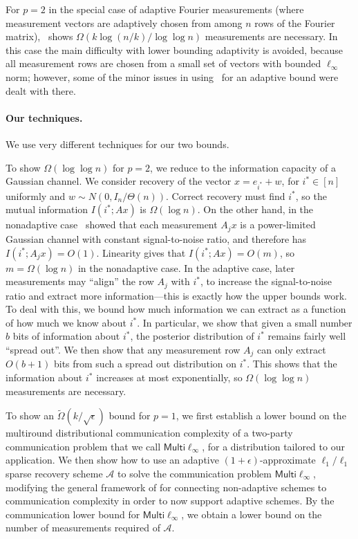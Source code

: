 \documentclass[twoside,leqno,twocolumn]{article}
\newcommand{\multiLinf}{\mathsf{Multi}\ell_{\infty}}
\def\eps{\epsilon}
\begin{document}
For $p=2$ in the special case of adaptive Fourier measurements (where
measurement vectors are adaptively chosen from among $n$ rows of the
Fourier matrix),~\cite{HIKP12} shows $\Omega(k \log (n/k) / \log \log
n)$ measurements are necessary.  In this case the main difficulty with
lower bounding adaptivity is avoided, because all measurement rows are
chosen from a small set of vectors with bounded $\ell_\infty$ norm;
however, some of the minor issues in using~\cite{PW11} for an adaptive
bound were dealt with there.

\paragraph{Our techniques.}  We use very different techniques for our
two bounds.

To show $\Omega(\log \log n)$ for $p=2$, we reduce to the information
capacity of a Gaussian channel.  We consider recovery of the vector $x
= e_{i^*} + w$, for $i^* \in [n]$ uniformly and $w \sim N(0,
I_n/\Theta(n))$.  Correct recovery must find $i^*$, so the mutual
information $I(i^*; Ax)$ is $\Omega(\log n)$.  On the other hand, in
the nonadaptive case~\cite{PW11} showed that each measurement $A_jx$
is a power-limited Gaussian channel with constant signal-to-noise
ratio, and therefore has $I(i^*; A_jx) = O(1)$.  Linearity gives that
$I(i^*; Ax) = O(m)$, so $m = \Omega(\log n)$ in the nonadaptive case.
In the adaptive case, later measurements may ``align'' the row $A_j$
with $i^*$, to increase the signal-to-noise ratio and extract more
information---this is exactly how the upper bounds work.  To deal with
this, we bound how much information we can extract as a function of
how much we know about $i^*$.  In particular, we show that given a
small number $b$ bits of information about $i^*$, the posterior
distribution of $i^*$ remains fairly well ``spread out''.  We then
show that any measurement row $A_j$ can only extract $O(b+1)$ bits
from such a spread out distribution on $i^*$.  This shows that the
information about $i^*$ increases at most exponentially, so
$\Omega(\log \log n)$ measurements are necessary.

To show an $\widetilde{\Omega}(k/\sqrt{\eps})$ bound for $p=1$, 
we first establish a lower bound on the multiround distributional 
communication complexity
of a two-party communication problem that we call $\multiLinf$, for a 
distribution tailored to our application. 
We then show how to use an adaptive $(1+\eps)$-approximate 
$\ell_1/\ell_1$ sparse
recovery scheme $\mathcal{A}$ 
to solve the communication problem $\multiLinf$, modifying the 
general framework
of \cite{PW11} for connecting non-adaptive schemes to communication 
complexity in
order to now support adaptive schemes. 
By the communication lower bound for $\multiLinf$, 
we obtain a lower bound on the number of measurements required of $\mathcal{A}$. 
\end{document}
